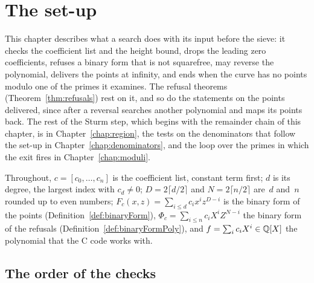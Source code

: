 \chapter{The set-up}\label{chap:setup}

This chapter describes what a search does with its input before the sieve: it checks the coefficient
list and the height bound, drops the leading zero coefficients, refuses a binary form that is not
squarefree, may reverse the polynomial, delivers the points at infinity, and ends when the curve has
no points modulo one of the primes it examines. The refusal theorems (Theorem~\ref{thm:refusals})
rest on it, and so do the statements on the points delivered, since after a reversal \ratpoints{}
searches another polynomial and maps its points back. The rest of the Sturm step, which begins with
the remainder chain of this chapter, is in Chapter~\ref{chap:region}, the tests on the denominators
that follow the set-up in Chapter~\ref{chap:denominators}, and the loop over the primes in which the
exit fires in Chapter~\ref{chap:moduli}.

Throughout, $c = [c_0, \dots, c_n]$ is the coefficient list, constant term first; $d$ is its degree,
the largest index with $c_d \ne 0$; $D = 2 \lceil d/2 \rceil$ and $N = 2 \lceil n/2 \rceil$ are~$d$
and~$n$ rounded up to even numbers; $F_c(x, z) = \sum_{i \le d} c_i x^i z^{D-i}$ is the binary form
of the points (Definition~\ref{def:binaryForm}), $\Phi_c = \sum_{i \le n} c_i X^i Z^{N-i}$ the
binary form of the refusals (Definition~\ref{def:binaryFormPoly}), and $f = \sum_i c_i X^i \in
\mathbb{Q}[X]$ the polynomial that the C code works with.

\section{The order of the checks}\label{sec:setupOrder}

